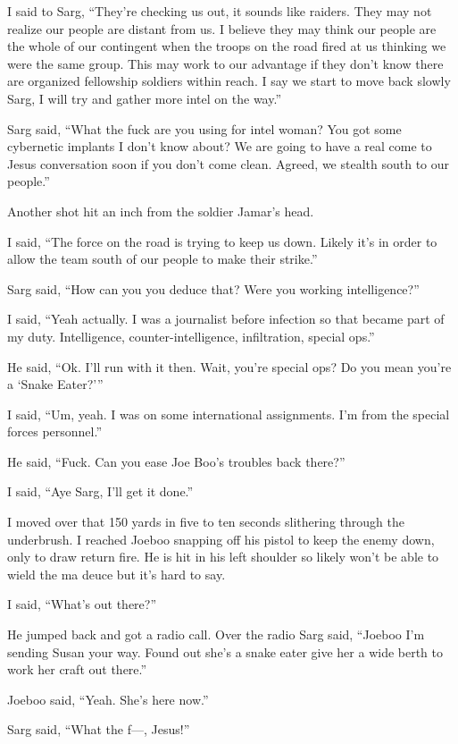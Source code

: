 I said to Sarg, ``They're checking us out, it sounds like raiders. They may not realize our people are distant from us. I believe they may think our people are the whole of our contingent when the troops on the road fired at us thinking we were the same group. This may work to our advantage if they don't know there are organized fellowship soldiers within reach. I say we start to move back slowly Sarg, I will try and gather more intel on the way.''

Sarg said, ``What the fuck are you using for intel woman? You got some cybernetic implants I don't know about? We are going to have a real come to Jesus conversation soon if you don't come clean. Agreed, we stealth south to our people.''

Another shot hit an inch from the soldier Jamar's head. 

I said, ``The force on the road is trying to keep us down. Likely it's in order to allow the team south of our people to make their strike.''

Sarg said, ``How can you you deduce that? Were you working intelligence?''

I said, ``Yeah actually. I was a journalist before infection so that became part of my duty. Intelligence, counter-intelligence, infiltration, special ops.''

He said, ``Ok. I'll run with it then. Wait, you're special ops? Do you mean you're a `Snake Eater?'''

I said, ``Um, yeah. I was on some international assignments.  I'm from the special forces personnel.''

He said, ``Fuck. Can you ease Joe Boo's troubles back there?''

I said, ``Aye Sarg, I'll get it done.''

I moved over that 150 yards in five to ten seconds slithering through the underbrush. I reached Joeboo snapping off his pistol to keep the enemy down, only to draw return fire. He is hit in his left shoulder so likely won't be able to wield the ma deuce but it's hard to say.

I said, ``What's out there?''

He jumped back and got a radio call. Over the radio Sarg said, ``Joeboo I'm sending Susan your way. Found out she's a snake eater give her a wide berth to work her craft out there.''

Joeboo said, ``Yeah. She's here now.''

Sarg said, ``What the f---, Jesus!''

